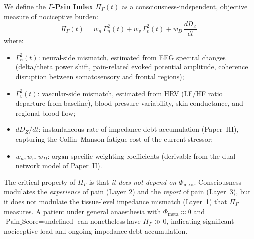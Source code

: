 \documentclass[aps,pre,twocolumn,superscriptaddress,floatfix]{revtex4-2}
\begin{document}
We define the \textbf{$\Gamma$-Pain Index}
$\Pi_{\Gamma}(t)$ as a consciousness-independent,
objective measure of nociceptive burden:
\begin{equation}
  \boxed{\;
  \Pi_{\Gamma}(t) =
    w_n\,\Gamma_n^2(t) + w_v\,\Gamma_v^2(t)
    + w_D\,\frac{dD_Z}{dt}\;
  }
  \label{eq:gamma-pain-index}
\end{equation}
where:
\begin{itemize}
  \item $\Gamma_n^2(t)$: neural-side mismatch, estimated
    from EEG spectral changes (delta/theta power shift,
    pain-related evoked potential amplitude, coherence
    disruption between somatosensory and frontal regions);
  \item $\Gamma_v^2(t)$: vascular-side mismatch, estimated
    from HRV (LF/HF ratio departure from baseline),
    blood pressure variability, skin conductance, and
    regional blood flow;
  \item $dD_Z/dt$: instantaneous rate of impedance debt
    accumulation (Paper~III), capturing the
    Coffin--Manson fatigue cost of the current stressor;
  \item $w_n, w_v, w_D$: organ-specific weighting
    coefficients (derivable from the dual-network model
    of Paper~II).
\end{itemize}

The critical property of $\Pi_{\Gamma}$ is that
\emph{it does not depend on $\Phi_{\text{meta}}$}.
Consciousness modulates the \emph{experience} of pain
(Layer~2) and the \emph{report} of pain (Layer~3), but
it does not modulate the tissue-level impedance mismatch
(Layer~1) that $\Pi_{\Gamma}$ measures.
A patient under general anaesthesia with
$\Phi_{\text{meta}}\approx 0$ and
$\text{Pain\_Score}=\text{undefined}$ can nonetheless
have $\Pi_{\Gamma}\gg 0$, indicating significant
nociceptive load and ongoing impedance debt accumulation.
\end{document}
